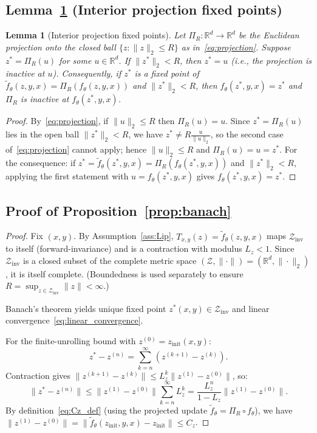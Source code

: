 \documentclass{article}
\theoremstyle{plain}
\newtheorem{lemma}[theorem]{Lemma}
\theoremstyle{definition}
\theoremstyle{remark}
\newcommand{\R}{\mathbb{R}}
\newcommand{\ZZ}{\mathcal{Z}}
\begin{document}
\subsection{Lemma~\ref{lem:interior_proj} (Interior projection fixed points)}

\begin{lemma}[Interior projection fixed points]
\label{lem:interior_proj}
Let $\Pi_R:\R^d\to\R^d$ be the Euclidean projection onto the closed ball $\{z:\|z\|_2\le R\}$ as in~\eqref{eq:projection}.
Suppose $z^*=\Pi_R(u)$ for some $u\in\R^d$.
If $\|z^*\|_2 < R$, then $z^* = u$ (i.e., the projection is inactive at $u$).
Consequently, if $z^*$ is a fixed point of $\tilde f_\theta(z,y,x)=\Pi_R(f_\theta(z,y,x))$ and $\|z^*\|_2 < R$, then $f_\theta(z^*,y,x)=z^*$ and $\Pi_R$ is inactive at $f_\theta(z^*,y,x)$.
\end{lemma}

\begin{proof}
By~\eqref{eq:projection}, if $\|u\|_2 \le R$ then $\Pi_R(u)=u$.
Since $z^*=\Pi_R(u)$ lies in the open ball $\|z^*\|_2<R$, we have $z^*\ne R\tfrac{u}{\|u\|_2}$, so the second case of~\eqref{eq:projection} cannot apply; hence $\|u\|_2\le R$ and $\Pi_R(u)=u=z^*$.
For the consequence: if $z^*=\tilde f_\theta(z^*,y,x)=\Pi_R(f_\theta(z^*,y,x))$ and $\|z^*\|_2<R$, applying the first statement with $u=f_\theta(z^*,y,x)$ gives $f_\theta(z^*,y,x)=z^*$.
\end{proof}



\subsection{Proof of Proposition~\ref{prop:banach}}

\begin{proof}
Fix $(x,y)$.
By Assumption~\ref{ass:Lip}, $T_{x,y}(z)=\tilde f_\theta(z,y,x)$ maps $\mathcal{Z}_{\mathrm{inv}}$ to itself (forward-invariance) and is a contraction with modulus $L_z<1$.
Since $\mathcal{Z}_{\mathrm{inv}}$ is a closed subset of the complete metric space $(\ZZ,\|\cdot\|)=(\R^d,\|\cdot\|_2)$, it is itself complete.
(Boundedness is used separately to ensure $R=\sup_{z\in\mathcal{Z}_{\mathrm{inv}}}\|z\|<\infty$.)

Banach's theorem yields unique fixed point $z^*(x,y) \in \mathcal{Z}_{\mathrm{inv}}$ and linear convergence~\eqref{eq:linear_convergence}.

For the finite-unrolling bound with $z^{(0)} = z_{\mathrm{init}}(x,y)$:
\[
z^* - z^{(n)} = \sum_{k=n}^{\infty}(z^{(k+1)} - z^{(k)}).
\]
Contraction gives $\|z^{(k+1)} - z^{(k)}\| \le L_z^k \|z^{(1)}-z^{(0)}\|$, so:
\[
\|z^* - z^{(n)}\| \le \|z^{(1)}-z^{(0)}\| \sum_{k=n}^{\infty} L_z^k = \frac{L_z^n}{1-L_z}\|z^{(1)}-z^{(0)}\|.
\]
By definition~\eqref{eq:Cz_def} (using the projected update $\tilde f_\theta=\Pi_R\circ f_\theta$), we have
$\|z^{(1)}-z^{(0)}\| = \|\tilde f_\theta(z_{\mathrm{init}},y,x) - z_{\mathrm{init}}\| \le C_z$.
\end{proof}
\end{document}
